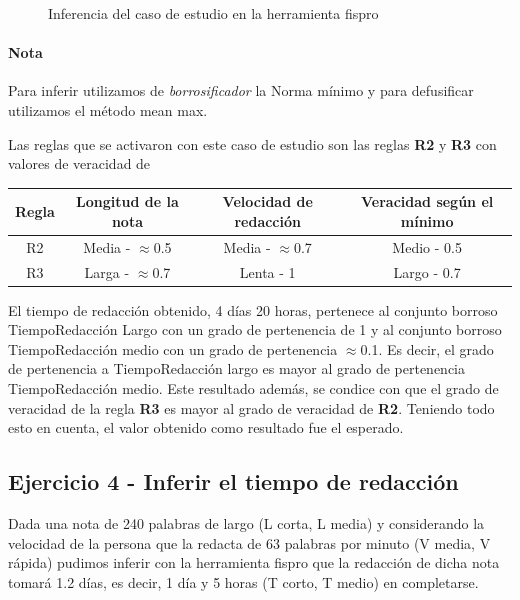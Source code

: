 \documentclass{article}
\begin{document}
\begin{itemize}
\begin{figure}[H]
	\centering
	\caption{Inferencia del caso de estudio en la herramienta fispro}
\end{figure}

\paragraph{Nota} Para inferir utilizamos de \textit{borrosificador} la Norma mínimo y para defusificar utilizamos el método mean max.

\vspace{3mm}
Las reglas que se activaron con este caso de estudio son las reglas \textbf{R2} y \textbf{R3} con valores de veracidad de

\begin{table}[H]
	\centering
	\begin{tabular}{c|c c|c}
		Regla&Longitud de la nota&Velocidad de redacción&Veracidad según el mínimo\\
		\hline
		R2&Media - $\approx$0.5&Media - $\approx$0.7&Medio - 0.5\\
		R3&Larga - $\approx$0.7&Lenta - 1&Largo - 0.7\\
	\end{tabular}
\end{table}

El tiempo de redacción obtenido, 4 días 20 horas, pertenece al conjunto borroso TiempoRedacción Largo con un grado de pertenencia de 1 y al conjunto borroso TiempoRedacción medio con un grado de pertenencia $\approx$0.1. Es decir, el grado de pertenencia a TiempoRedacción largo es mayor al grado de pertenencia TiempoRedacción medio. Este resultado además, se condice con que el grado de veracidad de la regla \textbf{R3} es mayor al grado de veracidad de \textbf{R2}. Teniendo todo esto en cuenta, el valor obtenido como resultado fue el esperado.

\pagebreak
\subsection*{Ejercicio 4 - Inferir el tiempo de redacción}

Dada una nota de 240 palabras de largo (L corta, L media) y considerando la velocidad de la persona que la redacta de 63 palabras por minuto (V media, V rápida) pudimos inferir con la herramienta fispro que la redacción de dicha nota tomará 1.2 días, es decir, 1 día y 5 horas (T corto, T medio) en completarse.


\end{itemize}
\end{document}
